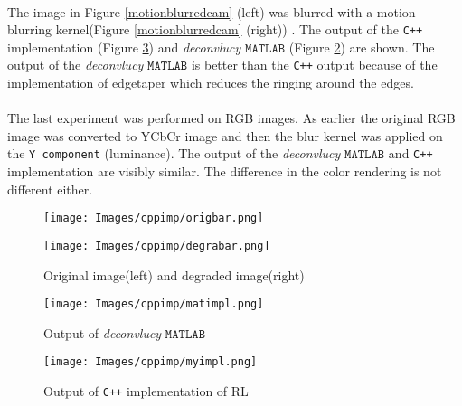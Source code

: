 \documentclass[a4paper]{book}
\begin{document}
\paragraph*{} The image in Figure \ref{motionblurredcam} (left) was blurred with a motion blurring kernel(Figure \ref{motionblurredcam} (right)) . The output of the \texttt{C++} implementation (Figure \ref{myimpl}) and \textit{deconvlucy} $ \mathtt{MATLAB} $ (Figure \ref{matimpl}) are shown. The output of the \textit{deconvlucy }$ \mathtt{MATLAB} $ is better than the \texttt{C++} output because of the implementation of edgetaper which reduces the ringing around the edges\cite{Ber05boundary}.

\paragraph*{} The last experiment was performed on RGB images. As earlier the original RGB image was converted to YCbCr image and then the blur kernel was applied on the \texttt{Y component} (luminance). The output of the  \textit{deconvlucy }$ \mathtt{MATLAB} $ and \texttt{C++} implementation are visibly similar. The difference in the color rendering is not different either.

\begin{figure}[]
	\begin{minipage}{0.45\textwidth}
		\centering
		\texttt{[image: Images/cppimp/origbar.png]}
	\end{minipage}\hfill
	\begin{minipage}{0.45\textwidth}
		\centering
		\texttt{[image: Images/cppimp/degrabar.png]}
	\end{minipage}
	\centering	
	\caption[Barbara Image \texttt{C++} implementation]{Original image(left) and degraded image(right)}
	\label{degrabar}
\end{figure}

\begin{figure}
	\centering
	\texttt{[image: Images/cppimp/matimpl.png]}
	\caption[$ \mathtt{MATLAB's}$ output ]{Output of \textit{deconvlucy} $ \mathtt{MATLAB} $}
	\label{matimpl}
\end{figure}

\begin{figure}
	\centering
	\texttt{[image: Images/cppimp/myimpl.png]}
	\caption[\texttt{C++} output]{Output of \texttt{C++} implementation of RL}
	\label{myimpl}
\end{figure}
\end{document}
